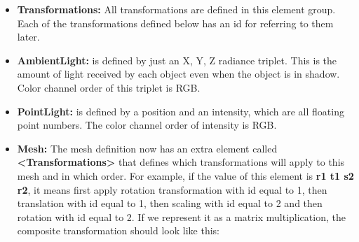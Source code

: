 \documentclass[12pt]{article}
\begin{document}
\begin{itemize}

\item \textbf{Transformations:} All transformations are defined in this
element group. Each of the transformations defined below has an id for
referring to them later.


%
\item \textbf{AmbientLight:}  is defined by just an X, Y, Z radiance
triplet. This is the amount of light received by each object even when
the object is in shadow. Color channel order of this triplet is RGB.

\item \textbf{PointLight:} is defined by a position and an intensity,
    which are all floating point numbers. The color channel order of
    intensity is RGB.

\item \textbf{Mesh:}  The mesh definition now has an extra element
called \textbf{\textless Transformations\textgreater} that defines which
transformations will apply to this mesh and in which order. For example,
if the value of this element is \textbf{r1 t1 s2 r2}, it means first
apply rotation transformation with id equal to 1, then translation with
id equal to 1, then scaling with id equal to 2 and then rotation with
id equal to 2. If we represent it as a matrix multiplication, the
composite transformation should look like this:


\end{itemize}
\end{document}
